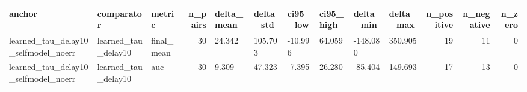 \begin{tabular}{lllrllllllrrr}
\toprule
anchor & comparator & metric & n_pairs & delta_mean & delta_std & ci95_low & ci95_high & delta_min & delta_max & n_positive & n_negative & n_zero \\
\midrule
learned_tau_delay10_selfmodel_noerr & learned_tau_delay10 & final_mean & 30 & 24.342 & 105.703 & -10.996 & 64.059 & -148.080 & 350.905 & 19 & 11 & 0 \\
learned_tau_delay10_selfmodel_noerr & learned_tau_delay10 & auc & 30 & 9.309 & 47.323 & -7.395 & 26.280 & -85.404 & 149.693 & 17 & 13 & 0 \\
\bottomrule
\end{tabular}
